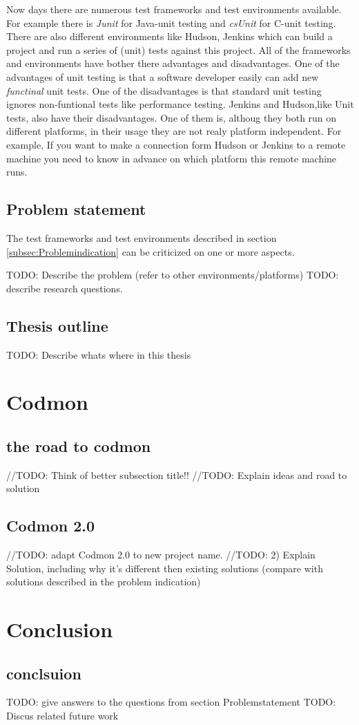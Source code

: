 \documentclass[a4paper,10pt]{scrartcl}
\newcommand{\CS}{C\nolinebreak\hspace{-.05em}\raisebox{.6ex}{\bf \#}}
\begin{document}
Now days there are numerous test frameworks and test environments available. For example there is \emph{Junit} for Java-unit testing and \emph{csUnit} for \CS{}-unit testing.
There are also different environments like Hudson, Jenkins which can build a project and run a series of (unit) tests against this project. All of the frameworks
and environments have bother there advantages and disadvantages. One of the advantages of unit testing is that a software developer easily can add new \emph{functinal} unit tests.
One of the disadvantages is that standard unit testing ignores non-funtional tests like performance testing. Jenkins and Hudson,like Unit tests, also have their
disadvantages. One of them is, althoug they both run on different platforms, in their usage they are not realy platform independent. For example, If you want
to make a connection form Hudson or Jenkins to a remote machine you need to know in advance on which platform this remote machine runs.


\subsection{Problem statement}
\label{subsec:Problemstatement}
The test frameworks and test environments described in section \ref{subsec:Problemindication} can be criticized on one or more aspects.

TODO: Describe the problem (refer to other environments/platforms)
TODO: describe research questions.

\subsection{Thesis outline}
\label{subsec:Thesisoutline}
TODO: Describe whats where in this thesis

\newpage

\section{Codmon}
\label{sec:codmon}

\subsection{the road to codmon}
//TODO: Think of better subsection title!!
//TODO: Explain ideas and road to solution

\subsection{Codmon 2.0}
//TODO: adapt Codmon 2.0 to new project name.
//TODO: 2) Explain Solution, including why it's different then existing solutions (compare with solutions described in the problem indication)

\newpage
\section{Conclusion}
\subsection{conclsuion}
TODO: give answers to the questions from section Problemstatement
TODO: Discus related future work
\newpage


\end{document}
